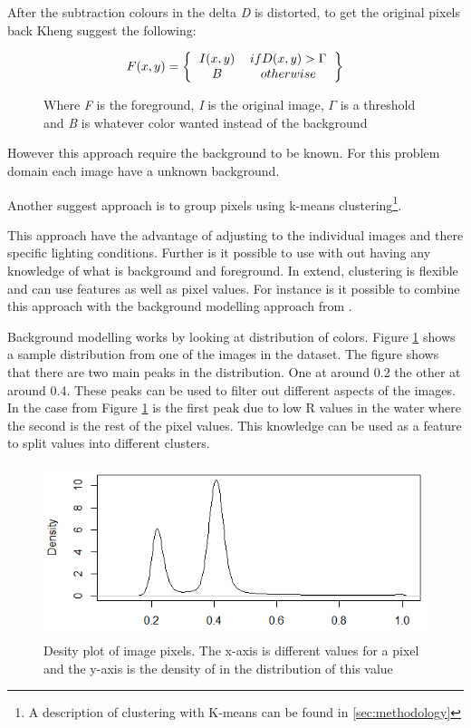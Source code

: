 After the subtraction colours in the delta \emph{D} is distorted, to get the original pixels back Kheng suggest the following:

\begin{figure}[H]
\begin{equation}
F(x,y) = \left \{
\begin{tabular}{cc}
$I(x,y)$ & $if D(x,y) > \Gamma$ \\
$B$      & $otherwise$
\end{tabular}  
\right \}
\end{equation}
\caption{Where \emph{F} is the foreground, \emph{I} is the original image, $\Gamma$ is a threshold and \emph{B} is whatever color wanted instead of the background}
\end{figure}

However this approach require the background to be known. For this problem domain each image have a unknown background.

Another suggest approach is to group pixels using k-means clustering\footnote{A description of clustering with K-means can be found in \ref{sec:methodology}}.

This approach have the advantage of adjusting to the individual images and there specific lighting conditions. Further is it possible to use with out having any knowledge of what is background and foreground. 
In extend, clustering is flexible and can use features as well as pixel values.
For instance is it possible to combine this approach with the background modelling approach from \cite{backgroundRemoval}.
  
Background modelling works by looking at distribution of colors. Figure \ref{fig:pixeldistribution} shows a sample distribution from one of the images in the dataset. The figure shows that there are two main peaks in the distribution. One at around 0.2 the other at around 0.4. 
These peaks can be used to filter out different aspects of the images. In the case from Figure \ref{fig:pixeldistribution} is the first peak due to low R values in the water where the second is the rest of the pixel values. 
This knowledge can be used as a feature to split values into different clusters.
 
\begin{figure}
\centering
\includegraphics[width=\linewidth]{Images/Distribution}
\caption{Desity plot of image pixels. The x-axis is different values for a pixel and the y-axis is the density of in the distribution of this value}
\label{fig:pixeldistribution}
\end{figure}











